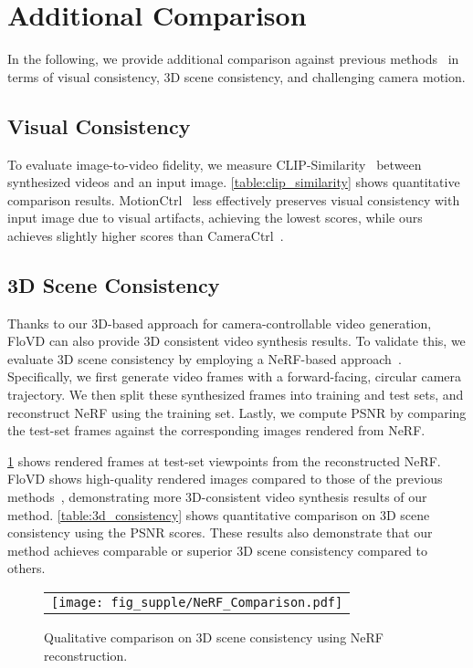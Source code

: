 \section{Additional Comparison}
In the following, we provide additional comparison against previous methods~\cite{wang2024motionctrl,he2024cameractrl} in terms of visual consistency, 3D scene consistency, and challenging camera motion.

\subsection{Visual Consistency}
To evaluate image-to-video fidelity, we measure CLIP-Similarity~\cite{radford2021learning} between synthesized videos and an input image.
\cref{table:clip_similarity} shows quantitative comparison results.
MotionCtrl~\cite{wang2024motionctrl} less effectively preserves visual consistency with input image due to visual artifacts, achieving the lowest scores, while ours achieves slightly higher scores than CameraCtrl~\cite{he2024cameractrl}.


\subsection{3D Scene Consistency}
Thanks to our 3D-based approach for camera-controllable video generation, FloVD can also provide 3D consistent video synthesis results.
To validate this, we evaluate 3D scene consistency by employing a NeRF-based approach~\cite{mildenhall2021nerf}. Specifically, we first generate video frames with a forward-facing, circular camera trajectory. We then split these synthesized frames into training and test sets, and reconstruct NeRF using the training set. 
Lastly, we compute PSNR by comparing the test-set frames against the corresponding images rendered from NeRF.

\cref{fig:NeRF_Comparison} shows rendered frames at test-set viewpoints from the reconstructed NeRF.
FloVD shows high-quality rendered images compared to those of the previous methods~\cite{wang2024motionctrl,he2024cameractrl}, demonstrating more 3D-consistent video synthesis results of our method.
\cref{table:3d_consistency} shows quantitative comparison on 3D scene consistency using the PSNR scores.
These results also demonstrate that our method achieves comparable or superior 3D scene consistency compared to others.


\begin{figure}[!t]
\centering
\begin{tabular}{@{}c}
\texttt{[image: fig\_supple/NeRF\_Comparison.pdf]} \\
\end{tabular}
\vspace{-3mm}
\caption{
Qualitative comparison on 3D scene consistency using NeRF~\cite{mildenhall2021nerf} reconstruction.
}
\vspace{-2mm}
\label{fig:NeRF_Comparison}
\end{figure}

